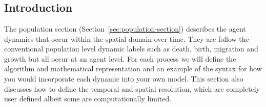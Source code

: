 \section{\label{sec:population-section}}

\subsection{Introduction}
The population section (Section~\ref{sec:population-section}) describes the agent dynamics that occur within the spatial domain over time. They are follow the conventional population level dynamic labels such as death, birth, migration and growth but all occur at an agent level. For each process we will define the algorithm and mathematical representation and an example of the syntax for how you would incorporate each dynamic into your own model. This section also discusses how to define the temporal and spatial resolution, which are completely user defined albeit some are computationally limited.

